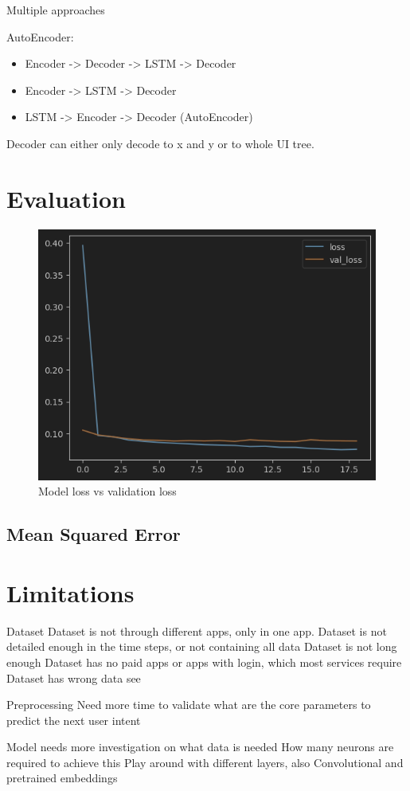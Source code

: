 
Multiple approaches


AutoEncoder:

\begin{itemize}
  \item Encoder -> Decoder -> LSTM -> Decoder
  \item Encoder -> LSTM -> Decoder
  \item LSTM -> Encoder -> Decoder (AutoEncoder)
\end{itemize}

Decoder can either only decode to x and y or to whole UI tree.

\section{Evaluation}

\begin{figure}[htbp!]
  \centering
  \includegraphics[width=\textwidth]{graphics/model_history_loss}
  \caption{Model loss vs validation loss}
  \label{fig:model_history_loss}
\end{figure}

\subsection{Mean Squared Error}

\section{Limitations}

Dataset
Dataset is not through different apps, only in one app.
Dataset is not detailed enough in the time steps, or not containing all data
Dataset is not long enough
Dataset has no paid apps or apps with login, which most services require
Dataset has wrong data see \cite{clay}

Preprocessing
Need more time to validate what are the core parameters to predict the next user intent


Model needs more investigation on what data is needed
How many neurons are required to achieve this
Play around with different layers, also Convolutional and pretrained embeddings

